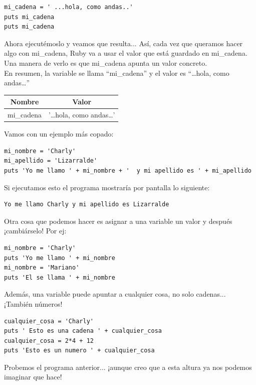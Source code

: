 \begin{lstlisting}
mi_cadena = ' ...hola, como andas..'
puts mi_cadena
puts mi_cadena
\end{lstlisting}

Ahora ejecutémoslo y veamos que resulta...
Así, cada vez que queramos hacer algo con mi\_cadena, Ruby va a usar el valor que está guardado en mi\_cadena. Una manera de verlo es que mi\_cadena apunta un valor concreto.\\

En resumen, la variable se llama “mi\_cadena” y el valor es “…hola, como andas…”

\begin{center}
\begin{tabular}{|c|c|}
\hline
\rowcolor[gray]{0.9}Nombre & Valor \\
\hline
mi\_cadena & '…hola, como andas…' \\
\hline
\end{tabular}
\end{center}

Vamos con un ejemplo más copado:

\begin{lstlisting}
mi_nombre = 'Charly'
mi_apellido = 'Lizarralde'
puts 'Yo me llamo ' + mi_nombre + '  y mi apellido es ' + mi_apellido
\end{lstlisting}

Si ejecutamos esto el programa mostraría por pantalla lo siguiente:

\begin{lstlisting}
Yo me llamo Charly y mi apellido es Lizarralde
\end{lstlisting}

Otra cosa que podemos hacer es asignar a una variable un valor y después ¡cambiárselo! Por ej: 

\begin{lstlisting}
mi_nombre = 'Charly'
puts 'Yo me llamo ' + mi_nombre
mi_nombre = 'Mariano'
puts 'El se llama ' + mi_nombre
\end{lstlisting}

Además, una variable puede apuntar a cualquier cosa, no solo cadenas... ¡También números! 

\begin{lstlisting}
cualquier_cosa = 'Charly'
puts ' Esto es una cadena ' + cualquier_cosa
cualquier_cosa = 2*4 + 12
puts 'Esto es un numero ' + cualquier_cosa
\end{lstlisting}

Probemos el programa anterior... ¡aunque creo que a esta altura ya nos podemos imaginar que hace!\\

